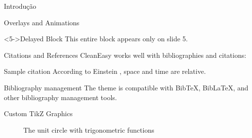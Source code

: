 \begin{frame}{Introdução}
\begin{frame}
\begin{frame}{Overlays and Animations}
  
  \begin{block}<5->{Delayed Block}
    This entire block appears only on slide 5.
  \end{block}
\end{frame}

\begin{frame}{Citations and References}
  CleanEasy works well with bibliographies and citations:
  
  \begin{block}{Sample citation}
    According to Einstein \cite{einstein1905}, space and time are relative.
  \end{block}
  
  \begin{exampleblock}{Bibliography management}
    The theme is compatible with BibTeX, BibLaTeX, and other bibliography management tools.
  \end{exampleblock}
  
\end{frame}

\begin{frame}{Custom TikZ Graphics}

  \begin{figure}
      \centering
      \caption{The unit circle with trigonometric functions}
      \label{fig:exampleTikz}
  \end{figure}
\end{frame}


\end{frame}
\end{frame}

